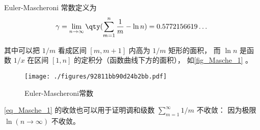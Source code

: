 
\begin{issues}
\issueDraft
\end{issues}


Euler-Mascheroni 常数定义为
\begin{equation}\label{eq_Masche_1}
\gamma = \lim_{n\to\infty} \qty(\sum_{m=1}^n \frac{1}{m} - \ln n) = 0.5772156619\dots~
\end{equation}

其中可以把 $1/m$ 看成区间 $[m, m+1]$ 内高为 $1/m$ 矩形的面积， 而 $\ln n$ 是函数 $1/x$ 在区间 $[1,n]$ 的定积分（函数曲线下方的面积）， 如\autoref{fig_Masche_1} 。

\begin{figure}[ht]
\centering
\texttt{[image: ./figures/92811bb90d24b2bb.pdf]}
\caption{Euler-Mascheroni常数} \label{fig_Masche_1}
\end{figure}

\autoref{eq_Masche_1} 的收敛也可以用于证明调和级数 $\sum_{m=1}^\infty 1/m$ 不收敛： 因为极限 $\ln(n\to\infty)$ 不收敛。
